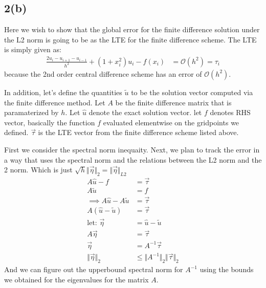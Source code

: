 \documentclass[]{article}
\begin{document}
    \subsection*{2(b)}
        Here we wish to show that the global error for the finite difference solution under the L2 norm is going to be as the LTE for the finite difference scheme. The LTE is simply given as: 
        \begin{align*}\tag{2.b.1}\label{eqn:2.b.1}
            \frac{2u_i - u_{i + 1} - u_{i - 1}}{h^2}
            + 
            (1 + x_i^2)u_i - f(x_i) &= \mathcal{O}(h^2) = \tau_i
        \end{align*}
        because the 2nd order central difference scheme has an error of $\mathcal{O}(h^2)$. 
        \par
        In addition, let's define the quantities $\tilde{u}$ to be the solution vector computed via the finite difference method. Let $A$ be the finite difference matrix that is paramaterized by $h$. Let $\hat{u}$ denote the exact solution vector. let $f$ denotes RHS vector, basically the function $f$ evaluated elementwise on the gridpoints we defined. $\vec{\tau}$ is the LTE vector from the finite difference scheme listed above. 
        \par
        First we consider the spectral norm inequaity. 
        Next, we plan to track the error in a way that uses the spectral norm and the relations between the L2 norm and the 2 norm. Which is just $\sqrt{h}\Vert \vec{\eta}\Vert_2 = \Vert \vec{\eta}\Vert_{L2}$
        \begin{align*}\tag{2.b.2}\label{eqn:2.b.2}
            A\hat{u} - f &= \vec{\tau} \\
            A\tilde{u} &= f
            \\
            \implies
            A\hat{u} - A\tilde{u} &= \vec{\tau}
            \\
            A(\hat{u} - \tilde{u}) &= \vec{\tau}
            \\
            \text{let: }\vec{\eta} &= \hat{u} - \tilde{u} 
            \\
            A\vec{\eta} &=\vec{\tau}
            \\
            \vec{\eta} &= A^{-1}\vec{\tau}
            \\
            \Vert \vec{\eta}\Vert_2 &\le 
            \Vert A^{-1}\Vert_2\Vert \vec{\tau}\Vert_2
        \end{align*}
        And we can figure out the upperbound spectral norm for $A^{-1}$ using the bounds we obtained for the eigenvalues for the matrix $A$. 
\end{document}
